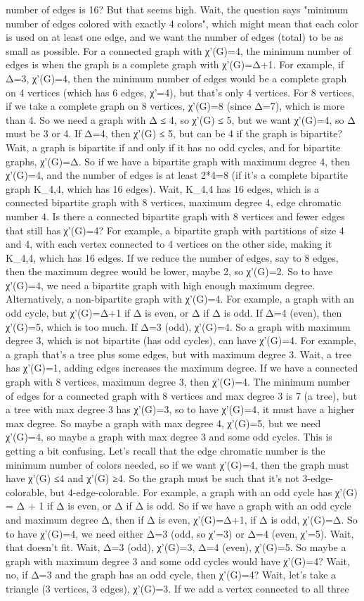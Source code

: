 number of edges is 16? But that seems high. Wait, the question says "minimum number of edges colored with exactly 4 colors", which might mean that each color is used on at least one edge, and we want the number of edges (total) to be as small as possible. For a connected graph with χ'(G)=4, the minimum number of edges is when the graph is a complete graph with χ'(G)=Δ+1. For example, if Δ=3, χ'(G)=4, then the minimum number of edges would be a complete graph on 4 vertices (which has 6 edges, χ'=4), but that's only 4 vertices. For 8 vertices, if we take a complete graph on 8 vertices, χ'(G)=8 (since Δ=7), which is more than 4. So we need a graph with Δ ≤ 4, so χ'(G) ≤ 5, but we want χ'(G)=4, so Δ must be 3 or 4. If Δ=4, then χ'(G) ≤ 5, but can be 4 if the graph is bipartite? Wait, a graph is bipartite if and only if it has no odd cycles, and for bipartite graphs, χ'(G)=Δ. So if we have a bipartite graph with maximum degree 4, then χ'(G)=4, and the number of edges is at least 2*4=8 (if it's a complete bipartite graph K_{4,4}, which has 16 edges). Wait, K_{4,4} has 16 edges, which is a connected bipartite graph with 8 vertices, maximum degree 4, edge chromatic number 4. Is there a connected bipartite graph with 8 vertices and fewer edges that still has χ'(G)=4? For example, a bipartite graph with partitions of size 4 and 4, with each vertex connected to 4 vertices on the other side, making it K_{4,4}, which has 16 edges. If we reduce the number of edges, say to 8 edges, then the maximum degree would be lower, maybe 2, so χ'(G)=2. So to have χ'(G)=4, we need a bipartite graph with high enough maximum degree. Alternatively, a non-bipartite graph with χ'(G)=4. For example, a graph with an odd cycle, but χ'(G)=Δ+1 if Δ is even, or Δ if Δ is odd. If Δ=4 (even), then χ'(G)=5, which is too much. If Δ=3 (odd), χ'(G)=4. So a graph with maximum degree 3, which is not bipartite (has odd cycles), can have χ'(G)=4. For example, a graph that's a tree plus some edges, but with maximum degree 3. Wait, a tree has χ'(G)=1, adding edges increases the maximum degree. If we have a connected graph with 8 vertices, maximum degree 3, then χ'(G)=4. The minimum number of edges for a connected graph with 8 vertices and max degree 3 is 7 (a tree), but a tree with max degree 3 has χ'(G)=3, so to have χ'(G)=4, it must have a higher max degree. So maybe a graph with max degree 4, χ'(G)=5, but we need χ'(G)=4, so maybe a graph with max degree 3 and some odd cycles. This is getting a bit confusing. Let's recall that the edge chromatic number is the minimum number of colors needed, so if we want χ'(G)=4, then the graph must have χ'(G) ≤4 and χ'(G) ≥4. So the graph must be such that it's not 3-edge-colorable, but 4-edge-colorable. For example, a graph with an odd cycle has χ'(G) = Δ + 1 if Δ is even, or Δ if Δ is odd. So if we have a graph with an odd cycle and maximum degree Δ, then if Δ is even, χ'(G)=Δ+1, if Δ is odd, χ'(G)=Δ. So to have χ'(G)=4, we need either Δ=3 (odd, so χ'=3) or Δ=4 (even, χ'=5). Wait, that doesn't fit. Wait, Δ=3 (odd), χ'(G)=3, Δ=4 (even), χ'(G)=5. So maybe a graph with maximum degree 3 and some odd cycles would have χ'(G)=4? Wait, no, if Δ=3 and the graph has an odd cycle, then χ'(G)=4? Wait, let's take a triangle (3 vertices, 3 edges), χ'(G)=3. If we add a vertex connected to all three 